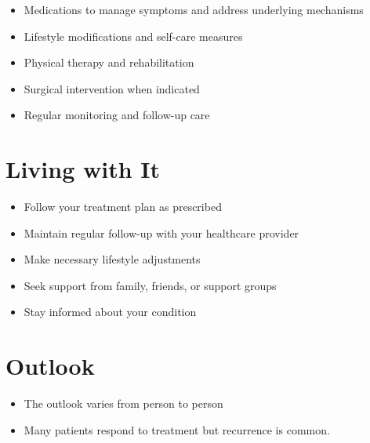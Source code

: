 \begin{itemize}[noitemsep]
  \item Medications to manage symptoms and address underlying mechanisms
  \item Lifestyle modifications and self-care measures
  \item Physical therapy and rehabilitation
  \item Surgical intervention when indicated
  \item Regular monitoring and follow-up care
\end{itemize}
\section{Living with It}
\begin{itemize}[noitemsep]
  \item Follow your treatment plan as prescribed
  \item Maintain regular follow-up with your healthcare provider
  \item Make necessary lifestyle adjustments
  \item Seek support from family, friends, or support groups
  \item Stay informed about your condition
\end{itemize}
\section{Outlook}
\begin{itemize}[noitemsep]
  \item The outlook varies from person to person
  \item Many patients respond to treatment but recurrence is common.
\end{itemize}
